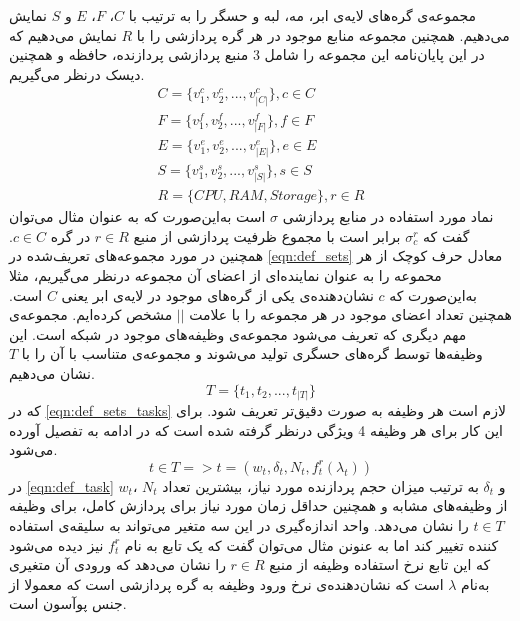     مجموعه‌ی گره‌های لایه‌ی ابر، مه، لبه و حسگر را به ترتیب با $C$، $F$، $E$ و $S$ نمایش می‌دهیم. همچنین مجموعه منابع موجود در هر گره پردازشی را با $R$ نمایش می‌دهیم که در این پایان‌نامه این مجموعه را شامل 3 منبع پردازشی پردازنده، حافظه و همچنین دیسک درنظر می‌گیریم. 
    \begin{subequations}\label{eqn:def_sets}
    	\begin{align}
    	C = \{v_1^c, v_2^c, ..., v_{|C|}^c\} , c \in C\\
    	F = \{v_1^f, v_2^f, ..., v_{|F|}^f\} , f \in F\\
    	E = \{v_1^e, v_2^e, ..., v_{|E|}^e\} , e \in E\\
    	S = \{v_1^s, v_2^s, ..., v_{|S|}^s\} , s \in S\\
    	R = \{CPU, RAM, Storage\} , r \in R
    	\end{align}
    \end{subequations}
    نماد مورد استفاده در منابع پردازشی $\sigma$ است به‌این‌صورت که به عنوان مثال می‌توان گفت که $\sigma_c^r$ برابر است با مجموع ظرفیت پردازشی از منبع $r \in R$ در گره $c \in C$. 
    همچنین در مورد مجموعه‌های تعریف‌‌شده در \cref{eqn:def_sets} معادل حرف کوچک از هر محموعه را به عنوان نماینده‌ای از اعضای آن مجموعه درنظر می‌گیریم، مثلا به‌این‌صورت که $c$ نشان‌دهنده‌ی یکی از گره‌های موجود در لایه‌ی ابر یعنی $C$ است. همچنین تعداد اعضای موجود در هر مجموعه را با علامت $||$ مشخص کرده‌ایم. 
    مجموعه‌ی مهم دیگری که تعریف می‌شود مجموعه‌ی وظیفه‌های موجود در شبکه است. این وظیفه‌ها توسط گره‌های حسگری تولید می‌شوند و مجموعه‌ی متناسب با آن را  با $T$ نشان می‌دهیم. 
    \begin{equation}\label{eqn:def_sets_tasks}
    	T = \{t_1, t_2, ..., t_{|T|}\}
    \end{equation}
	که در \cref{eqn:def_sets_tasks} لازم است هر وظیفه به صورت دقیق‌تر تعریف شود. برای این‌ کار برای هر وظیفه 4 ویژگی درنظر گرفته شده است که در ادامه به تفصیل آورده می‌شود. 
	\begin{equation}\label{eqn:def_task}
	t \in T => t = (w_t, \delta_t, N_t, f_t^r(\lambda_t))
	\end{equation}
	در \cref{eqn:def_task} $w_t$، $N_t$ و $\delta_t$ به ترتیب میزان حجم پردازنده مورد نیاز، بیشترین تعداد از وظیفه‌های مشابه و همچنین حداقل زمان مورد نیاز برای پردازش کامل، برای وظیفه $t \in T$ را نشان می‌دهد. واحد اندازه‌گیری در این سه متغیر می‌تواند به سلیقه‌ی استفاده کننده تغییر کند اما به عنونن مثال می‌توان گفت که     یک تابع به نام $f_t^r$ نیز دیده می‌شود که این تابع نرخ استفاده وظیفه از منبع $r \in R$ را نشان می‌دهد که ورودی آن متغیری به‌نام $\lambda$ است که نشان‌دهنده‌ی نرخ ورود وظیفه به گره پردازشی است که معمولا از جنس پوآسون است. 
	
